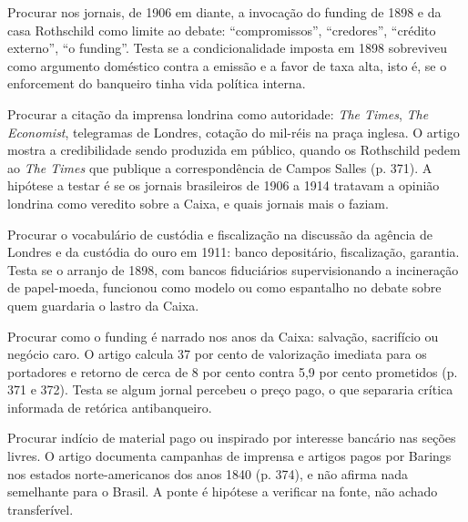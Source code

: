 \begin{dialogo}
\item Procurar nos jornais, de 1906 em diante, a invocação do funding de 1898 e
  da casa Rothschild como limite ao debate: ``compromissos'', ``credores'',
  ``crédito externo'', ``o funding''. Testa se a condicionalidade imposta em 1898
  sobreviveu como argumento doméstico contra a emissão e a favor de taxa alta,
  isto é, se o enforcement do banqueiro tinha vida política interna.
\item Procurar a citação da imprensa londrina como autoridade: \emph{The Times},
  \emph{The Economist}, telegramas de Londres, cotação do mil-réis na praça
  inglesa. O artigo mostra a credibilidade sendo produzida em público, quando os
  Rothschild pedem ao \emph{The Times} que publique a correspondência de Campos
  Salles (p. 371). A hipótese a testar é se os jornais brasileiros de 1906 a 1914
  tratavam a opinião londrina como veredito sobre a Caixa, e quais jornais mais o
  faziam.
\item Procurar o vocabulário de custódia e fiscalização na discussão da agência
  de Londres e da custódia do ouro em 1911: banco depositário, fiscalização,
  garantia. Testa se o arranjo de 1898, com bancos fiduciários supervisionando a
  incineração de papel-moeda, funcionou como modelo ou como espantalho no debate
  sobre quem guardaria o lastro da Caixa.
\item Procurar como o funding é narrado nos anos da Caixa: salvação, sacrifício
  ou negócio caro. O artigo calcula 37 por cento de valorização imediata para os
  portadores e retorno de cerca de 8 por cento contra 5,9 por cento prometidos
  (p. 371 e 372). Testa se algum jornal percebeu o preço pago, o que separaria
  crítica informada de retórica antibanqueiro.
\item Procurar indício de material pago ou inspirado por interesse bancário nas
  seções livres. O artigo documenta campanhas de imprensa e artigos pagos por
  Barings nos estados norte-americanos dos anos 1840 (p. 374), e não afirma nada
  semelhante para o Brasil. A ponte é hipótese a verificar na fonte, não achado
  transferível.
\end{dialogo}

